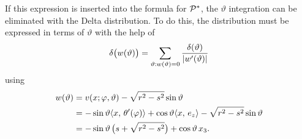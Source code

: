 \documentclass{amsart}
\renewcommand*{\phi}{\varphi}
\begin{document}
%
If this expression is inserted into the formula for ${\mathcal{P}}^*$, the $\vartheta$ integration can be eliminated with the Delta distribution. To 
do this, the distribution must be expressed in terms of $\vartheta$ with the help of
%
\begin{equation*}
 \delta\big(w(\vartheta)\big) = \sum_{\vartheta:w(\vartheta)=0} \frac{\delta(\vartheta)}{|w'(\vartheta)|}
\end{equation*}
%
using
%
\begin{align*}
 w(\vartheta) 
 &= v(x; \phi, \vartheta) - \sqrt{r^2-s^2}\sin\vartheta \\
 &= -\sin\vartheta \INNER{x}{\theta'(\phi)} + \cos\vartheta \INNER{x}{e_z} - \sqrt{r^2-s^2}\sin\vartheta \\
 &= -\sin\vartheta\, \big(s + \sqrt{r^2-s^2}\big) + \cos\vartheta\, x_3.
\end{align*}
\end{document}
